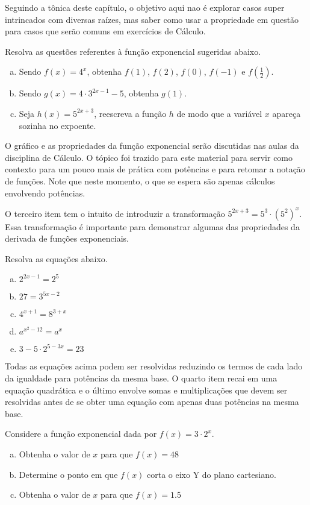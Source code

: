 \documentclass[main_estudante.tex]{subfiles}
\begin{document}
Seguindo a tônica deste capítulo, o objetivo aqui nao é explorar casos super intrincados com diversas raízes, mas saber como usar a propriedade em questão para casos que serão comuns em exercícios de Cálculo.

\begin{questao}
Resolva as questões referentes à função exponencial sugeridas abaixo.
\begin{enumerate}[a)]
\item Sendo $f(x)=4^x$, obtenha $f(1)$, $f(2)$, $f(0)$, $f(-1)$ e $f(\frac{1}{2})$.
\item Sendo $g(x)=4 \cdot 3^{2x-1}-5$, obtenha $g(1)$.
\item Seja $h(x)=5^{2x+3}$, reescreva a função $h$ de modo que a variável $x$ apareça sozinha no expoente.
\end{enumerate}
\end{questao}

O gráfico e as propriedades da função exponencial serão discutidas nas aulas da disciplina de Cálculo. O tópico foi trazido para este material para servir como contexto para um pouco mais de prática com potências e para retomar a notação de funções. Note que neste momento, o que se espera são apenas cálculos envolvendo potências.

O terceiro item tem o intuito de introduzir a transformação $5^{2x+3}=5^3 \cdot (5^2)^x$. Essa transformação é importante para demonstrar algumas das propriedades da derivada de funções exponenciais.

\begin{questao}
Resolva as equações abaixo.
\begin{enumerate}[a)]
\item $2^{2x-1} = 2^5$
\item $27 = 3^{5x-2}$
\item $4^{x+1}=8^{3+x}$
\item $a^{x^2-12}=a^{x}$
\item $3-5 \cdot 2^{5-3x} = 23$
\end{enumerate}
\end{questao}

Todas as equações acima podem ser resolvidas reduzindo os termos de cada lado da igualdade para potências da mesma base. O quarto item recai em uma equação quadrática e o último envolve somas e multiplicações que devem ser resolvidas antes de se obter uma equação com apenas duas potências na mesma base.

\begin{questao}
Considere a função exponencial dada por $f(x)=3 \cdot 2^x$.
\begin{enumerate}[a)]
\item Obtenha o valor de $x$ para que $f(x)=48$
\item Determine o ponto em que $f(x)$ corta o eixo Y do plano cartesiano.
\item Obtenha o valor de $x$ para que $f(x)=1.5$
\end{enumerate}
\end{questao}
\end{document}
